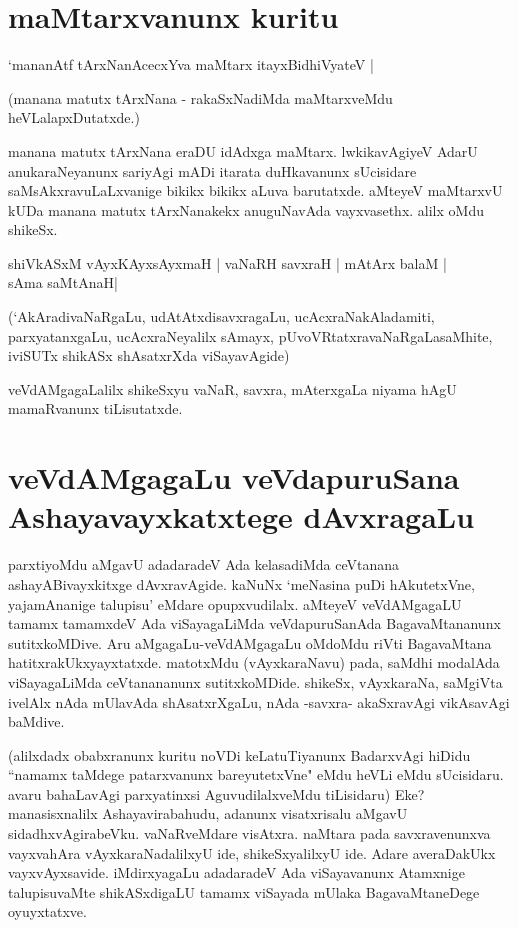 \section*{maMtarxvanunx kuritu}

\begin{shloka}
`mananAtf tArxNanAcecxYva maMtarx itayxBidhiVyateV |\label{10}
\end{shloka}

(manana matutx tArxNana - rakaSxNadiMda maMtarxveMdu heVLalapxDutatxde.)

manana matutx tArxNana eraDU idAdxga maMtarx. lwkikavAgiyeV AdarU anukaraNeyanunx sariyAgi mADi itarata duHkavanunx sUcisidare saMsAkxravuLaLxvanige bikikx bikikx aLuva barutatxde. aMteyeV maMtarxvU kUDa manana matutx tArxNanakekx anuguNavAda vayxvasethx. alilx oMdu shikeSx.

\begin{shloka}
shiVkASxM vAyxKAyxsAyxmaH | vaNaRH savxraH | mAtArx balaM |\label{10a}\\
sAma saMtAnaH|
\end{shloka}

(`AkAradivaNaRgaLu, udAtAtxdisavxragaLu, ucAcxraNakAladamiti, parxyatanxgaLu, ucAcxraNeyalilx sAmayx, pUvoVRtatxravaNaRgaLasaMhite, iviSUTx shikASx shAsatxrXda viSayavAgide)

veVdAMgagaLalilx shikeSxyu vaNaR, savxra, mAterxgaLa niyama hAgU mamaRvanunx tiLisutatxde.

\section*{veVdAMgagaLu veVdapuruSana Ashayavayxkatxtege dAvxragaLu}

parxtiyoMdu aMgavU adadaradeV Ada kelasadiMda ceVtanana ashayABivayxkitxge dAvxravAgide. kaNuNx `meNasina puDi hAkutetxVne, yajamAnanige talupisu' eMdare opupxvudilalx. aMteyeV veVdAMgagaLU tamamx tamamxdeV Ada viSayagaLiMda veVdapuruSanAda BagavaMtananunx sutitxkoMDive. Aru aMgagaLu-veVdAMgagaLu oMdoMdu riVti BagavaMtana hatitxrakUkxyayxtatxde. matotxMdu (vAyxkaraNavu) pada, saMdhi modalAda viSayagaLiMda ceVtanananunx sutitxkoMDide. shikeSx, vAyxkaraNa, saMgiVta ivelAlx nAda mUlavAda shAsatxrXgaLu, nAda -savxra- akaSxravAgi vikAsavAgi baMdive. 

(alilxdadx obabxranunx kuritu noVDi keLatuTiyanunx BadarxvAgi hiDidu ``namamx taMdege patarxvanunx bareyutetxVne" eMdu heVLi eMdu sUcisidaru. avaru bahaLavAgi parxyatinxsi AguvudilalxveMdu tiLisidaru) Eke? manasisxnalilx Ashayavirabahudu, adanunx visatxrisalu aMgavU sidadhxvAgirabeVku. vaNaRveMdare visAtxra. naMtara pada savxravenunxva vayxvahAra vAyxkaraNadalilxyU ide, shikeSxyalilxyU ide. Adare averaDakUkx vayxvAyxsavide. iMdirxyagaLu adadaradeV Ada viSayavanunx Atamxnige talupisuvaMte shikASxdigaLU tamamx viSayada mUlaka BagavaMtaneDege  oyuyxtatxve.

